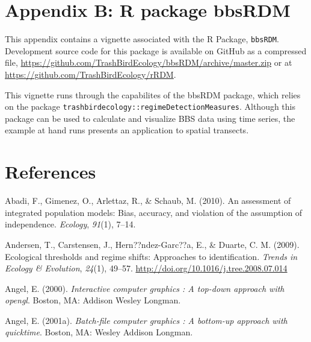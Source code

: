 \documentclass[12pt,twoside,openany]{reedthesis}
\begin{document}
\chapter*{Appendix B: R package bbsRDM}\label{bbsRDM}

This appendix contains a vignette associated with the R Package,
\texttt{bbsRDM}. Development source code for this package is available
on GitHub as a compressed file,
\url{https://github.com/TrashBirdEcology/bbsRDM/archive/master.zip} or
at \url{https://github.com/TrashBirdEcology/rRDM}.

This vignette runs through the capabilites of the bbsRDM package, which
relies on the package
\texttt{trashbirdecology::regimeDetectionMeasures}. Although this
package can be used to calculate and visualize BBS data using time
series, the example at hand runs presents an application to spatial
transects.

\backmatter

\chapter*{References}\label{references}


\noindent

\setlength{\parindent}{-0.20in} \setlength{\leftskip}{0.20in}
\setlength{\parskip}{8pt}

\hypertarget{refs}{}
\hypertarget{ref-abadi2010assessment}{}
Abadi, F., Gimenez, O., Arlettaz, R., \& Schaub, M. (2010). An
assessment of integrated population models: Bias, accuracy, and
violation of the assumption of independence. \emph{Ecology},
\emph{91}(1), 7--14.

\hypertarget{ref-andersen_ecological_2009}{}
Andersen, T., Carstensen, J., Hern??ndez-Garc??a, E., \& Duarte, C. M.
(2009). Ecological thresholds and regime shifts: Approaches to
identification. \emph{Trends in Ecology \& Evolution}, \emph{24}(1),
49--57. \url{http://doi.org/10.1016/j.tree.2008.07.014}

\hypertarget{ref-angel2000}{}
Angel, E. (2000). \emph{Interactive computer graphics : A top-down
approach with opengl}. Boston, MA: Addison Wesley Longman.

\hypertarget{ref-angel2001}{}
Angel, E. (2001a). \emph{Batch-file computer graphics : A bottom-up
approach with quicktime}. Boston, MA: Wesley Addison Longman.
\end{document}
